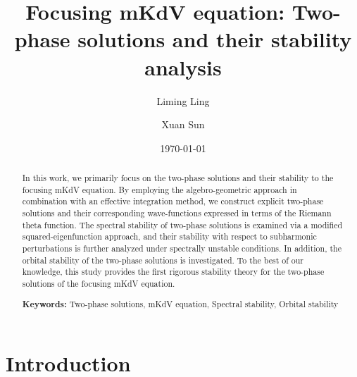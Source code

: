 \documentclass[11pt,reqno]{amsart}
\numberwithin{equation}{section}
\begin{document}
\title{Focusing mKdV equation: Two-phase solutions and their stability analysis}

\author{Liming Ling}
\address{School of Mathematics, South China University of Technology, Guangzhou, China, 510641}

\author{Xuan Sun}
\address{School of Mathematics and Statistics, Donghua University, Shanghai, China, 201620}



\begin{abstract} 
	In this work, we primarily focus on the two-phase solutions and their stability to the focusing mKdV equation.
	By employing the algebro-geometric approach in combination with an effective integration method, we construct explicit two-phase solutions and their corresponding wave-functions expressed in terms of the Riemann theta function. 
	The spectral stability of two-phase solutions is examined via a modified squared-eigenfunction approach, and their stability with respect to subharmonic perturbations is further analyzed under spectrally unstable conditions.
	In addition, the orbital stability of the two-phase solutions is investigated.
	To the best of our knowledge, this study provides the first rigorous stability theory for the two-phase solutions of the focusing mKdV equation.
	
{\bf Keywords:} Two-phase solutions, mKdV equation, Spectral stability, Orbital stability
\end{abstract}


\date{\today}

\maketitle

\section{Introduction}
\end{document}
